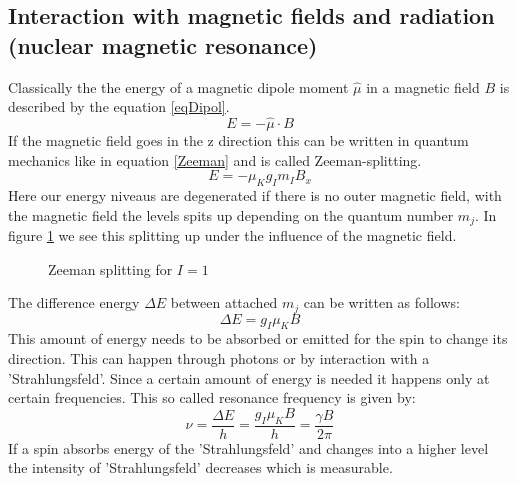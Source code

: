 \subsection{Interaction with magnetic fields and radiation (nuclear magnetic resonance)}
Classically the the energy of a magnetic dipole moment $\hat{\mu}$ in a magnetic field $B$ is described by the equation \ref{eqDipol}.
\begin{equation}
E=-\hat{\mu}\cdot B
\label{eqDipol}
\end{equation}
If the magnetic field goes in the z direction this can be written in quantum mechanics like in equation \ref{Zeeman} and is called Zeeman-splitting. 
\begin{equation}
E = - \mu_K g_I m_I B_x
\label{Zeeman}
\end{equation}
Here our energy niveaus are degenerated if there is no outer magnetic field, with the magnetic field the levels spits up depending on the quantum number $m_j$. In figure \ref{ZeemanBild} we see this splitting up under the influence of the magnetic field. 
\begin{figure}[h]
	\centering
	\caption{Zeeman splitting for $I=1$}
	\label{ZeemanBild}
\end{figure}
The difference energy $\Delta E$ between attached $m_j$ can be written as follows:
\begin{equation}
\Delta E = g_I \mu_K B
\end{equation}   
This amount of energy needs to be absorbed or emitted for the spin to change its direction. This can happen through photons or by interaction with a 'Strahlungsfeld'. Since a certain amount of energy is needed it happens only at certain frequencies. This so called resonance frequency is given by:
\begin{equation}
	\nu = \frac{\Delta E}{h}=\frac{g_I\mu_KB}{h}=\frac{\gamma B}{2\pi}	
\end{equation}
If a spin absorbs energy of the 'Strahlungsfeld' and changes into a higher level the intensity of 'Strahlungsfeld' decreases which is measurable. 

